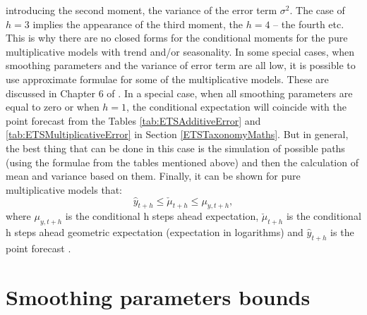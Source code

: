 \documentclass[
]{book}
\theoremstyle{definition}
\theoremstyle{definition}
\theoremstyle{definition}
\theoremstyle{definition}
\theoremstyle{remark}
\begin{document}
introducing the second moment, the variance of the error term \(\sigma^2\). The case of \(h=3\) implies the appearance of the third moment, the \(h=4\) -- the fourth etc. This is why there are no closed forms for the conditional moments for the pure multiplicative models with trend and/or seasonality. In some special cases, when smoothing parameters and the variance of error term are all low, it is possible to use approximate formulae for some of the multiplicative models. These are discussed in Chapter 6 of \citet{Hyndman2008b}. In a special case, when all smoothing parameters are equal to zero or when \(h=1\), the conditional expectation will coincide with the point forecast from the Tables \ref{tab:ETSAdditiveError} and \ref{tab:ETSMultiplicativeError} in Section \ref{ETSTaxonomyMaths}. But in general, the best thing that can be done in this case is the simulation of possible paths (using the formulae from the tables mentioned above) and then the calculation of mean and variance based on them. Finally, it can be shown for pure multiplicative models that:
\begin{equation}
    \hat{y}_{t+h} \leq \check{\mu}_{t+h} \leq \mu_{y,t+h} ,
    \label{eq:ETSADAMpointValueInequality}
\end{equation}
where \(\mu_{y,t+h}\) is the conditional h steps ahead expectation, \(\check{\mu}_{t+h}\) is the conditional h steps ahead geometric expectation (expectation in logarithms) and \(\hat{y}_{t+h}\) is the point forecast \citep{Svetunkov2020ETS}.

\hypertarget{stabilityConditionMultiplicativeError}{%
\section{Smoothing parameters bounds}\label{stabilityConditionMultiplicativeError}}
\end{document}
